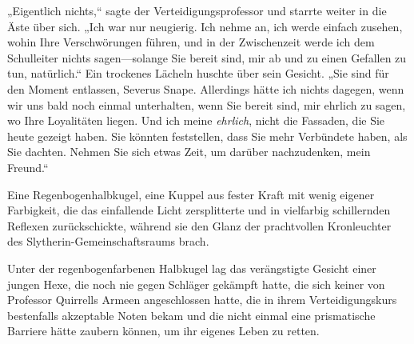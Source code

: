 „Eigentlich nichts,“ sagte der Verteidigungsprofessor und starrte weiter in die Äste über sich. „Ich war nur neugierig. Ich nehme an, ich werde einfach zusehen, wohin Ihre Verschwörungen führen, und in der Zwischenzeit werde ich dem Schulleiter nichts sagen—solange Sie bereit sind, mir ab und zu einen Gefallen zu tun, natürlich.“ Ein trockenes Lächeln huschte über sein Gesicht. „Sie sind für den Moment entlassen, Severus Snape. Allerdings hätte ich nichts dagegen, wenn wir uns bald noch einmal unterhalten, wenn Sie bereit sind, mir ehrlich zu sagen, wo Ihre Loyalitäten liegen. Und ich meine \emph{ehrlich}, nicht die Fassaden, die Sie heute gezeigt haben. Sie könnten feststellen, dass Sie mehr Verbündete haben, als Sie dachten. Nehmen Sie sich etwas Zeit, um darüber nachzudenken, mein Freund.“


Eine Regenbogenhalbkugel, eine Kuppel aus fester Kraft mit wenig eigener Farbigkeit, die das einfallende Licht zersplitterte und in vielfarbig schillernden Reflexen zurückschickte, während sie den Glanz der prachtvollen Kronleuchter des Slytherin-Gemeinschaftsraums brach.

Unter der regenbogenfarbenen Halbkugel lag das verängstigte Gesicht einer jungen Hexe, die noch nie gegen Schläger gekämpft hatte, die sich keiner von Professor Quirrells Armeen angeschlossen hatte, die in ihrem Verteidigungskurs bestenfalls akzeptable Noten bekam und die nicht einmal eine prismatische Barriere hätte zaubern können, um ihr eigenes Leben zu retten.

